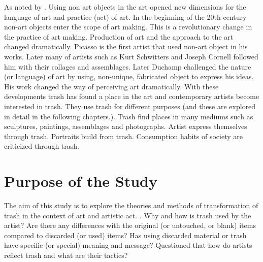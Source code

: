 %
%
As noted by \cite{pye2010trashculture} . Using non art objects in the art opened new dimensions for the language of art and practice (act) of art. In the beginning of the 20th century non-art objects 
enter the scope of art making. This is a revolutionary change in the practice of art making. Production of art and the approach to the art changed dramatically. 
Picasso is the first artist that used non-art object in his works. Later many of artists such as Kurt Schwitters and Joseph Cornell  followed him with their collages and assemblages. Later Duchamp challenged the nature (or language) of art by using, non-unique, fabricated object to express his ideas. His work changed the way of perceiving art dramatically. With these developments trash has found a place in the art and contemporary artists become interested in trash. They use trash for different purposes (and these are explored in detail in the following chapters.). Trash find places in many mediums such as sculptures, paintings, assemblages and photographs. Artist express themselves through trash. Portraits build from trash. Consumption habits of society are criticized through trash.





%
\section{Purpose of the Study}




The aim of this study is to explore the theories and methods of transformation of trash in the context of art and artistic act. 
 \citep{ibarra2015beautiful}.
Why and how is trash used by the artist? Are there any differences with the original (or untouched, or blank) items compared to discarded (or used) items? Has using discarded material or trash have specific (or special) meaning and message? Questioned that how do artists reflect trash and what are their tactics?

